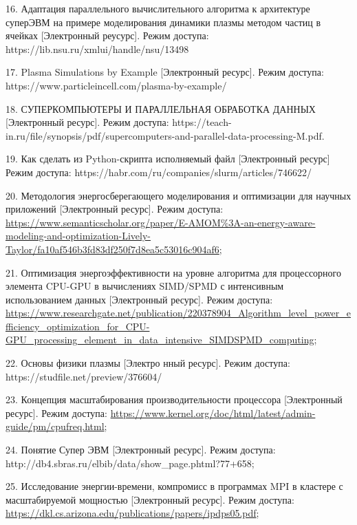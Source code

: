 \documentclass{article}
\begin{document}
16. Адаптация параллельного вычислительного алгоритма к архитектуре суперЭВМ на примере моделирования динамики плазмы методом частиц в ячейках [Электронный реусурс]. Режим доступа: https://lib.nsu.ru/xmlui/handle/nsu/13498

17. Plasma Simulations by Example [Электронный ресурс]. Режим доступа: https://www.particleincell.com/plasma-by-example/

18. СУПЕРКОМПЬЮТЕРЫ И ПАРАЛЛЕЛЬНАЯ ОБРАБОТКА
ДАННЫХ [Электронный ресурс]. Режим доступа: https://teach-in.ru/file/synopsis/pdf/supercomputers-and-parallel-data-processing-M.pdf.

19. Как сделать из Python-скрипта исполняемый файл [Электронный ресурс] Режим доступа: https://habr.com/ru/companies/slurm/articles/746622/

20.  Методология энергосберегающего моделирования и оптимизации для научных приложений [Электронный ресурс].
Режим доступа: \href{https://www.semanticscholar.org/paper/E-AMOM\%3A-an-energy-aware-modeling-and-optimization-Lively-Taylor/fa10af546b3fd83df250f7d8ea5c53016c904af6}{https://www.semanticscholar.org/paper/E-AMOM\%3A-an-energy-aware-modeling-and-optimization-Lively-Taylor/fa10af546b3fd83df250f7d8ea5c53016c904af6};

21. Оптимизация энергоэффективности на уровне алгоритма для процессорного элемента CPU-GPU в вычислениях SIMD/SPMD с интенсивным использованием данных [Электронный ресурс].
Режим доступа: \href{https://www.researchgate.net/publication/220378904_Algorithm_level_power_efficiency_optimization_for_CPU-GPU_processing_element_in_data_intensive_SIMDSPMD_computing}{https://www.researchgate.net/publication/220378904\_Algorithm\_level\_power\_efficiency\_optimization\_for\_CPU-GPU\_processing\_element\_in\_data\_intensive\_SIMDSPMD\_computing};

22. Основы физики плазмы [Электро
нный ресурс]. Режим доступа: https://studfile.net/preview/376604/

23. Концепция масштабирования производительности процессора [Электронный ресурс].
Режим доступа: \href{https://www.kernel.org/doc/html/latest/admin-guide/pm/cpufreq.html}{https://www.kernel.org/doc/html/latest/admin-guide/pm/cpufreq.html};

24. Понятие Супер ЭВМ [Электронный ресурс]. Режим доступа: http://db4.sbras.ru/elbib/data/show_page.phtml?77+658;

25. Исследование энергии-времени, компромисс в программах MPI в кластере с масштабируемой мощностью [Электронный ресурс].
Режим доступа: \href{https://dkl.cs.arizona.edu/publications/papers/ipdps05.pdf}{https://dkl.cs.arizona.edu/publications/papers/ipdps05.pdf};
\end{document}
